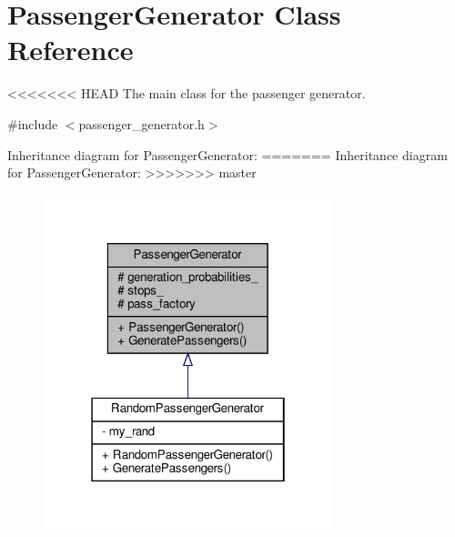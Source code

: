 \hypertarget{classPassengerGenerator}{}\section{Passenger\+Generator Class Reference}
\label{classPassengerGenerator}


<<<<<<< HEAD
The main class for the passenger generator.  




{\ttfamily \#include $<$passenger\+\_\+generator.\+h$>$}



Inheritance diagram for Passenger\+Generator\+:\nopagebreak
=======
Inheritance diagram for Passenger\+Generator\+:
\nopagebreak
>>>>>>> master
\begin{figure}[H]
\begin{center}
\leavevmode
\includegraphics[width=238pt]{classPassengerGenerator__inherit__graph}
\end{center}
\end{figure}


